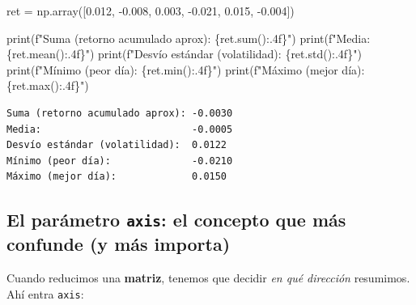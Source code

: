 \documentclass[
  spanish,
  letterpaper,
  DIV=11,
  numbers=noendperiod]{scrreprt}
\newenvironment{Shaded}{\begin{snugshade}}{\end{snugshade}}
\newcommand{\BuiltInTok}[1]{\textcolor[rgb]{0.00,0.23,0.31}{#1}}
\newcommand{\FloatTok}[1]{\textcolor[rgb]{0.68,0.00,0.00}{#1}}
\newcommand{\NormalTok}[1]{\textcolor[rgb]{0.00,0.23,0.31}{#1}}
\newcommand{\OperatorTok}[1]{\textcolor[rgb]{0.37,0.37,0.37}{#1}}
\newcommand{\SpecialCharTok}[1]{\textcolor[rgb]{0.37,0.37,0.37}{#1}}
\newcommand{\SpecialStringTok}[1]{\textcolor[rgb]{0.13,0.47,0.30}{#1}}
\begin{document}
\label{reducciones}
\begin{Shaded}
\begin{Highlighting}[]
\NormalTok{ret }\OperatorTok{=}\NormalTok{ np.array([}\FloatTok{0.012}\NormalTok{, }\OperatorTok{{-}}\FloatTok{0.008}\NormalTok{, }\FloatTok{0.003}\NormalTok{, }\OperatorTok{{-}}\FloatTok{0.021}\NormalTok{, }\FloatTok{0.015}\NormalTok{, }\OperatorTok{{-}}\FloatTok{0.004}\NormalTok{])}

\BuiltInTok{print}\NormalTok{(}\SpecialStringTok{f"Suma (retorno acumulado aprox): }\SpecialCharTok{\{}\NormalTok{ret}\SpecialCharTok{.}\BuiltInTok{sum}\NormalTok{()}\SpecialCharTok{:.4f\}}\SpecialStringTok{"}\NormalTok{)}
\BuiltInTok{print}\NormalTok{(}\SpecialStringTok{f"Media:                          }\SpecialCharTok{\{}\NormalTok{ret}\SpecialCharTok{.}\NormalTok{mean()}\SpecialCharTok{:.4f\}}\SpecialStringTok{"}\NormalTok{)}
\BuiltInTok{print}\NormalTok{(}\SpecialStringTok{f"Desvío estándar (volatilidad):  }\SpecialCharTok{\{}\NormalTok{ret}\SpecialCharTok{.}\NormalTok{std()}\SpecialCharTok{:.4f\}}\SpecialStringTok{"}\NormalTok{)}
\BuiltInTok{print}\NormalTok{(}\SpecialStringTok{f"Mínimo (peor día):              }\SpecialCharTok{\{}\NormalTok{ret}\SpecialCharTok{.}\BuiltInTok{min}\NormalTok{()}\SpecialCharTok{:.4f\}}\SpecialStringTok{"}\NormalTok{)}
\BuiltInTok{print}\NormalTok{(}\SpecialStringTok{f"Máximo (mejor día):             }\SpecialCharTok{\{}\NormalTok{ret}\SpecialCharTok{.}\BuiltInTok{max}\NormalTok{()}\SpecialCharTok{:.4f\}}\SpecialStringTok{"}\NormalTok{)}
\end{Highlighting}
\end{Shaded}

\begin{verbatim}
Suma (retorno acumulado aprox): -0.0030
Media:                          -0.0005
Desvío estándar (volatilidad):  0.0122
Mínimo (peor día):              -0.0210
Máximo (mejor día):             0.0150
\end{verbatim}

\subsection{\texorpdfstring{El parámetro \texttt{axis}: el concepto que
más confunde (y más
importa)}{El parámetro axis: el concepto que más confunde (y más importa)}}\label{el-paruxe1metro-axis-el-concepto-que-muxe1s-confunde-y-muxe1s-importa}

Cuando reducimos una \textbf{matriz}, tenemos que decidir \emph{en qué
dirección} resumimos. Ahí entra \texttt{axis}:
\end{document}
